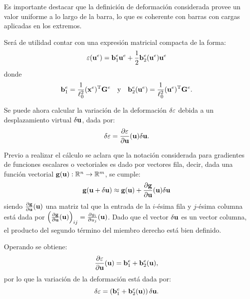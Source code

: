 Es importante destacar que la definición de deformación considerada provee un valor uniforme a lo largo de la barra, lo que es coherente con barras con cargas aplicadas en los extremos. %
%


Será de utilidad contar con una expresión matricial compacta de la forma:
%
\begin{equation}
\varepsilon ({\bf u}^e) = {\bf b}^e_1 {\bf u}^e +  \frac{1}{2} {\bf b}_{2}^e({\bf u}^e) {\bf u}^e
\end{equation}
%
donde
%
\begin{equation}\label{eqn:exprbs}
{\bf b}^e_1 =  \frac{1}{\ell_0^2} 
({\bf x}^e)^{\text{T}} {\bf G}^e
\quad
\text{y}
\quad
{\bf b}^e_2 ({\bf u}^e) = \frac{1}{\ell_0^2}  ({\bf u}^e)^{\text{T}} {\bf G}^e.
\end{equation}



Se puede ahora calcular la variación de la deformación $\delta\varepsilon$ debida a un desplazamiento virtual $\delta{\bf u}$, dada por:
%
\begin{equation}
\delta \varepsilon =  \frac{\partial \varepsilon}{\partial {\bf u}}({\bf u}) \delta {\bf u}.
\end{equation}

Previo a realizar el cálculo se aclara que la notación considerada para gradientes de funciones escalares o vectoriales es dado por vectores fila, decir, dada una función vectorial ${\bf g}({\bf u}) :{\mathbb R}^n \rightarrow {\mathbb R}^m $, se cumple:
%
\begin{equation}
{\bf g}({\bf u}+\delta{\bf u}) \approx {\bf g}({\bf u}) + \frac{\partial {\bf g} }{\partial {\bf u}}({\bf u}) \delta {\bf u}
\end{equation}
%
siendo $\frac{\partial {\bf g} }{\partial {\bf u}}({\bf u})$ una matriz tal que la entrada de la $i$-ésima fila y $j$-ésima columna está dada por $ \left( \frac{\partial {\bf g} }{\partial {\bf u}}({\bf u}) \right)_{ij} =  \frac{\partial g_i }{\partial u_j }({\bf u})$. %
%
Dado que el vector $\delta {\bf u}$ es un vector columna, el producto del segundo término del miembro derecho está bien definido.




Operando se obtiene:
%
\begin{equation} \label{eqn:derivepsilon}
\frac{\partial \varepsilon}{\partial {\bf u} }({\bf u})  =  {\bf b}_1^e + {\bf b}_2^e({\bf u}),
\end{equation}
%
por lo que la variación de la deformación está dada por:
%
\begin{equation}\label{eqn:variacionepsilon}
\delta \varepsilon = \left( {\bf b}_1^e + {\bf b}_2^e({\bf u}) \right) \delta {\bf u}.
\end{equation}


